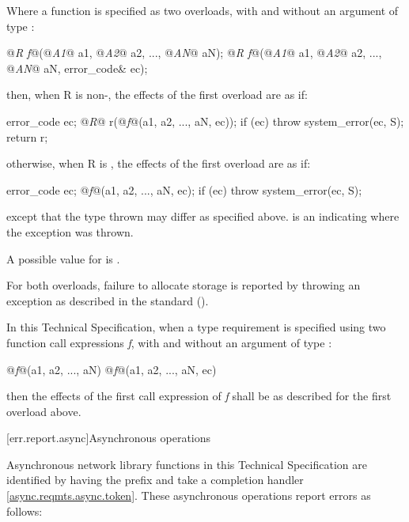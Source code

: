 \pnum
Where a function is specified as two overloads, with and without an argument of type :

\begin{codeblock}
@\textit{R f}@(@\textit{A1}@ a1, @\textit{A2}@ a2, ..., @\textit{AN}@ aN);
@\textit{R f}@(@\textit{A1}@ a1, @\textit{A2}@ a2, ..., @\textit{AN}@ aN, error_code& ec);
\end{codeblock}

\pnum
then, when R is non-, the effects of the first overload are as if:

\begin{codeblock}
error_code ec;
@\textit{R}@ r(@\textit{f}@(a1, a2, ..., aN, ec));
if (ec) throw system_error(ec, S);
return r;
\end{codeblock}

\pnum
otherwise, when R is , the effects of the first overload are as if:

\begin{codeblock}
error_code ec;
@\textit{f}@(a1, a2, ..., aN, ec);
if (ec) throw system_error(ec, S);
\end{codeblock}

\pnum
except that the type thrown may differ as specified above.  is an \ntbs indicating where the exception was thrown. \begin{note} A possible value for  is . \end{note}

\pnum
 For both overloads, failure to allocate storage is reported by throwing an exception as described in the \Cpp standard ().

\pnum
In this Technical Specification, when a type requirement is specified using two function call expressions \textit{f}, with and without an argument  of type :

\begin{codeblock}
@\textit{f}@(a1, a2, ..., aN)
@\textit{f}@(a1, a2, ..., aN, ec)
\end{codeblock}

then the effects of the first call expression of \textit{f} shall be as described for the first overload above.



[err.report.async]{Asynchronous operations}

\pnum
Asynchronous network library functions in this Technical Specification are identified by having the prefix  and take a completion handler \ref{async.reqmts.async.token}. These asynchronous operations report errors as follows:

